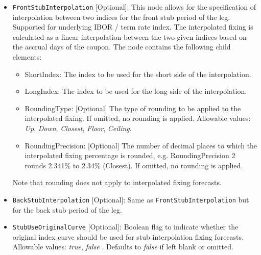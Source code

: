 \begin{itemize}
\item \lstinline!FrontStubInterpolation! [Optional]: This node allows for the specification of interpolation between two indices for the front stub period of the leg.
Supported for underlying IBOR / term rate index. The interpolated fixing is calculated as a linear interpolation between the two given indices based on the accrual days of the coupon.
The node contains the following child elements:
  \begin{itemize}
  \item ShortIndex: The index to be used for the short side of the interpolation.
  \item LongIndex: The index to be used for the long side of the interpolation.
  \item RoundingType: [Optional] The type of rounding to be applied to the interpolated fixing. If omitted, no rounding is applied.
  Allowable values: \emph{Up}, \emph{Down}, \emph{Closest}, \emph{Floor}, \emph{Ceiling}.
  \item RoundingPrecision: [Optional] The number of decimal places to which the interpolated fixing percentage is rounded,
  e.g. RoundingPrecision 2 rounds 2.341\% to 2.34\% (Closest). If omitted, no rounding is applied.
  \end{itemize}
Note that rounding does not apply to interpolated fixing forecasts.

\item \lstinline!BackStubInterpolation! [Optional]: Same as \lstinline!FrontStubInterpolation! but for the back stub period of the leg.

\item \lstinline!StubUseOriginalCurve! [Optional]: Boolean flag to indicate whether the original index curve should be used for stub interpolation fixing forecasts.
  Allowable values: \emph{true}, \emph{false} . Defaults to \emph{false} if left blank or omitted.


\end{itemize}
